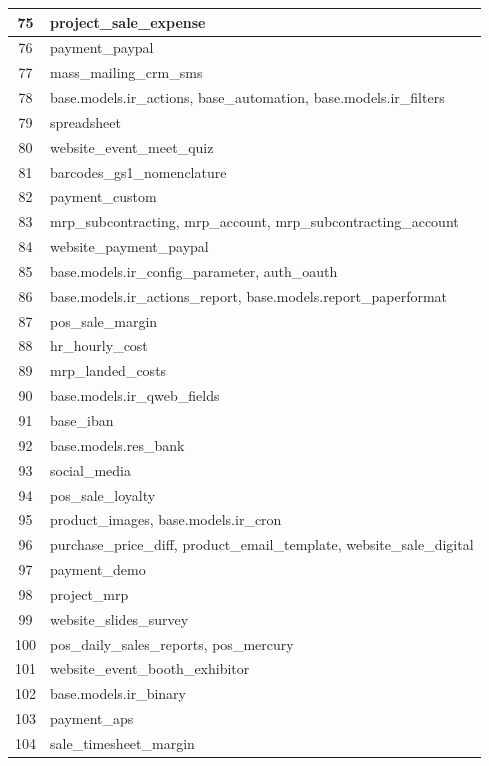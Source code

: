 \begin{small}
\begin{longtable}{|c|p{14cm}|}
75 & project{\_}sale{\_}expense \\ \hline
76 & payment{\_}paypal \\ \hline
77 & mass{\_}mailing{\_}crm{\_}sms \\ \hline
78 & base.models.ir{\_}actions, base{\_}automation, base.models.ir{\_}filters \\ \hline
79 & spreadsheet \\ \hline
80 & website{\_}event{\_}meet{\_}quiz \\ \hline
81 & barcodes{\_}gs1{\_}nomenclature \\ \hline
82 & payment{\_}custom \\ \hline
83 & mrp{\_}subcontracting, mrp{\_}account, mrp{\_}subcontracting{\_}account \\ \hline
84 & website{\_}payment{\_}paypal \\ \hline
85 & base.models.ir{\_}config{\_}parameter, auth{\_}oauth \\ \hline
86 & base.models.ir{\_}actions{\_}report, base.models.report{\_}paperformat \\ \hline
87 & pos{\_}sale{\_}margin \\ \hline
88 & hr{\_}hourly{\_}cost \\ \hline
89 & mrp{\_}landed{\_}costs \\ \hline
90 & base.models.ir{\_}qweb{\_}fields \\ \hline
91 & base{\_}iban \\ \hline
92 & base.models.res{\_}bank \\ \hline
93 & social{\_}media \\ \hline
94 & pos{\_}sale{\_}loyalty \\ \hline
95 & product{\_}images, base.models.ir{\_}cron \\ \hline
96 & purchase{\_}price{\_}diff, product{\_}email{\_}template, website{\_}sale{\_}digital \\ \hline
97 & payment{\_}demo \\ \hline
98 & project{\_}mrp \\ \hline
99 & website{\_}slides{\_}survey \\ \hline
100 & pos{\_}daily{\_}sales{\_}reports, pos{\_}mercury \\ \hline
101 & website{\_}event{\_}booth{\_}exhibitor \\ \hline
102 & base.models.ir{\_}binary \\ \hline
103 & payment{\_}aps \\ \hline
104 & sale{\_}timesheet{\_}margin \\ \hline

\end{longtable}
\end{small}
